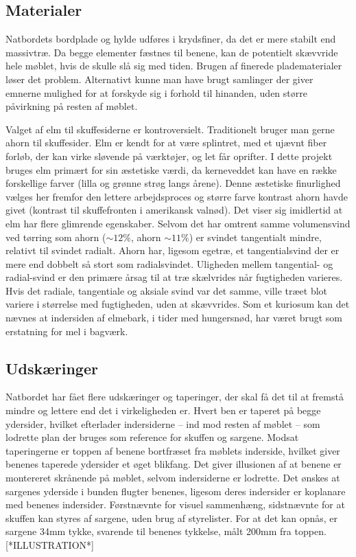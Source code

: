 \subsection*{Materialer}
Natbordets bordplade og hylde udføres i krydsfiner, da det er mere stabilt
end massivtræ. Da begge elementer fæstnes til benene, kan de potentielt
skævvride hele møblet, hvis de skulle slå sig med tiden. Brugen af finerede
pladematerialer løser det problem. Alternativt kunne man have brugt samlinger
der giver emnerne mulighed for at forskyde sig i forhold til hinanden, uden
større påvirkning på resten af møblet.

Valget af elm til skuffesiderne er kontroversielt. Traditionelt bruger man gerne
ahorn til skuffesider.
Elm er kendt for at være splintret, med et ujævnt fiber forløb, der kan virke
sløvende på værktøjer, og let får oprifter\footnotemark. I dette projekt bruges
elm primært for sin æstetiske værdi, da kerneveddet kan have en række
forskellige farver (lilla og grønne strøg langs årene). Denne æstetiske
finurlighed vælges her fremfor den lettere arbejdsproces og større farve
kontrast ahorn havde givet (kontrast til skuffefronten i amerikansk valnød). Det
viser sig imidlertid at elm har flere glimrende egenskaber. Selvom det har
omtrent samme volumensvind ved tørring som ahorn ($\sim12\%$, ahorn $\sim11\%$)
er svindet tangentialt mindre, relativt til svindet radialt. Ahorn har, ligesom
egetræ, et tangentialsvind der er mere end dobbelt så stort som radialsvindet.
Uligheden mellem tangential- og radial-svind er den primære årsag til at træ
skælvrides når fugtigheden varieres. Hvis det radiale, tangentiale og aksiale
svind var det samme, ville træet blot variere i størrelse med fugtigheden, uden
at skævvrides. Som et kuriosum kan det nævnes at indersiden af elmebark, i tider
med hungersnød, har været brugt som erstatning for mel i bagværk.


\subsection*{Udskæringer}
Natbordet har fået flere udskæringer og taperinger, der skal få det til at
fremstå mindre og lettere end det i virkeligheden er. Hvert ben er taperet på
begge ydersider, hvilket  efterlader indersiderne -- ind mod resten af møblet --
som lodrette plan der bruges som reference for skuffen og sargene. Modsat
taperingerne er toppen af benene bortfræset fra møblets inderside, hvilket giver
benenes taperede ydersider et øget blikfang. Det giver illusionen af at benene
er montereret skrånende på møblet, selvom indersiderne er lodrette. Det ønskes
at sargenes yderside i bunden flugter benenes, ligesom deres indersider er
koplanare med benenes indersider. Førstnævnte for visuel sammenhæng, sidstnævnte
for at skuffen kan styres af sargene, uden brug af styrelister. For at det kan
opnås, er sargene 34mm tykke, svarende til benenes tykkelse, målt 200mm fra
toppen. [*ILLUSTRATION*]

